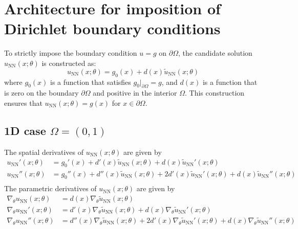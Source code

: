 \documentclass{article}
\begin{document}

\section{Architecture for imposition of Dirichlet boundary conditions}
To strictly impose the boundary condition $u = g$ on $\partial \Omega$, the candidate solution $u_{\text{NN}}(x; \theta)$ is constructed as:
$$u_{\text{NN}}(x; \theta) = g_0(x) + d(x) \widetilde{u}_{\text{NN}}(x; \theta)$$
where $g_0(x)$ is a function that satisfies $g_0|_{\partial\Omega} = g$, and $d(x)$ is a function that is zero on the boundary $\partial\Omega$ and positive in the interior $\Omega$. This construction ensures that $u_{\text{NN}}(x; \theta) = g(x)$ for $x \in \partial \Omega$.

\subsection{1D case $\Omega = (0,1)$}

The spatial derivatives of $u_{\text{NN}}(x;\theta)$ are given by
\begin{equation}
    \begin{split}
        u_{\text{NN}}'(x;\theta) & = g_0'(x) + d'(x) \widetilde{u}_{\text{NN}}(x;\theta) + d(x) \widetilde{u}_{\text{NN}}'(x;\theta) \\
        u_{\text{NN}}''(x;\theta) & = g_0''(x) + d''(x) \widetilde{u}_{\text{NN}}(x;\theta) + 2d'(x) \widetilde{u}_{\text{NN}}'(x;\theta) + d(x) \widetilde{u}_{\text{NN}}''(x;\theta)\\
    \end{split}
\end{equation}
The parametric derivatives of $u_{\text{NN}}(x;\theta)$ are given by
\begin{equation}
    \begin{split}
        \nabla_\theta u_{\text{NN}}(x;\theta) & = d(x) \nabla_\theta \widetilde{u}_{\text{NN}}(x;\theta) \\
        \nabla_\theta u_{\text{NN}}'(x;\theta) & = d'(x) \nabla_\theta \widetilde{u}_{\text{NN}}(x;\theta) + d(x) \nabla_\theta \widetilde{u}_{\text{NN}}'(x;\theta) \\
        \nabla_\theta u_{\text{NN}}''(x;\theta) & = d''(x) \nabla_\theta \widetilde{u}_{\text{NN}}(x;\theta) + 2d'(x) \nabla_\theta \widetilde{u}_{\text{NN}}'(x;\theta) + d(x) \nabla_\theta \widetilde{u}_{\text{NN}}''(x;\theta)\\
    \end{split}
\end{equation}
\end{document}
